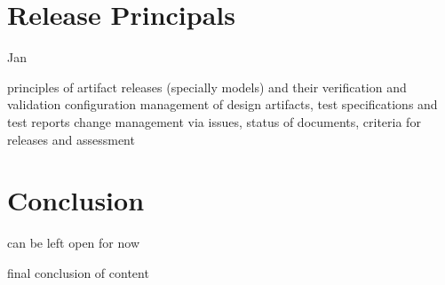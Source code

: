 \documentclass{template/openetcs_report}
\begin{document}
\chapter{Release Principals}
\label{sec:Releases}

Jan

principles of artifact releases (specially models) and their verification and validation
configuration management of design artifacts, test specifications and test reports
change management via issues, status of documents, criteria for releases and assessment


\chapter{Conclusion}
\label{sec:conclusion}

can be left open for now

final conclusion of content 


%


\end{document}
